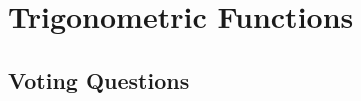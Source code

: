\section{Trigonometric Functions} \label{S.0.5.TrigFunctions}


\newpage

\newpage

\newpage

\subsection*{Voting Questions}

\newpage

